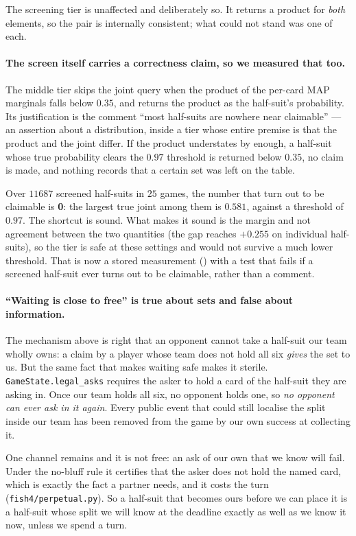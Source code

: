 \documentclass[11pt,letterpaper]{article}
\begin{document}
The screening tier is unaffected and deliberately so. It returns a product for
\emph{both} elements, so the pair is internally consistent; what could not
stand was one of each.

\paragraph{The screen itself carries a correctness claim, so we measured
that too.} The middle tier skips the joint query when the product of the
per-card MAP marginals falls below $0.35$, and returns the product as the
half-suit's probability. Its justification is the comment ``most half-suits are
nowhere near claimable'' --- an assertion about a distribution, inside a tier
whose entire premise is that the product and the joint differ. If the product
understates by enough, a half-suit whose true probability clears the $0.97$
threshold is returned below $0.35$, no claim is made, and nothing records that
a certain set was left on the table.

Over $11687$ screened half-suits in $25$ games, the number that turn out to be
claimable is \textbf{0}: the largest true joint among them is $0.581$, against
a threshold of $0.97$. The shortcut is sound. What makes it sound is the margin and not
agreement between the two quantities (the gap reaches $+0.255$ on individual
half-suits), so the tier is safe at these settings and would not survive a
much lower threshold. That is now a stored measurement
() with a test that fails if a
screened half-suit ever turns out to be claimable, rather than a comment.

\paragraph{``Waiting is close to free'' is true about sets and false about
information.} The mechanism above is right that an opponent cannot take a
half-suit our team wholly owns: a claim by a player whose team does not hold
all six \emph{gives} the set to us. But the same fact that makes waiting safe
makes it sterile.
\texttt{GameState.legal\_asks} requires the asker to hold a card of the
half-suit they are asking in. Once our team holds all six, no opponent holds
one, so \emph{no opponent can ever ask in it again}. Every public event that
could still localise the split inside our team has been removed from the game
by our own success at collecting it.

One channel remains and it is not free: an ask of our own that we know will
fail. Under the no-bluff rule it certifies that the asker does not hold the
named card, which is exactly the fact a partner needs, and it costs the turn
(\texttt{fish4/perpetual.py}). So a half-suit that becomes ours before we can
place it is a half-suit whose split we will know at the deadline exactly as
well as we know it now, unless we spend a turn.
\end{document}

